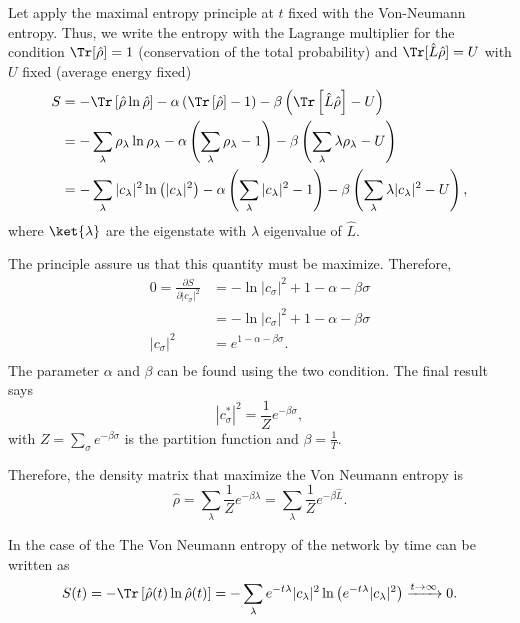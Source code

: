 Let apply the maximal entropy principle at $t$ fixed with the Von-Neumann entropy. Thus, we write the entropy with the Lagrange multiplier for the condition $\Tr[\hat\rho] = 1$ (conservation of the total probability) and $\Tr[\hat L\hat\rho] = U$ with $U$ fixed (average energy fixed)
\begin{equation*}
    \begin{split}
        S &= -\Tr\left[\hat\rho\ln\hat\rho\right] - \alpha\left(\Tr\left[\hat\rho\right] - 1\right) -\beta\left(\Tr\left[\hat L\hat\rho\right] - U\right)\\
        &= -\sum_\lambda \rho_\lambda\ln \rho_\lambda - \alpha\left(\sum_\lambda \rho_\lambda - 1\right) -\beta\left(\sum_\lambda\lambda \rho_\lambda - U\right)\\
        & = -\sum_\lambda |c_\lambda|^2\ln \left(|c_\lambda|^2\right) - \alpha\left(\sum_\lambda |c_\lambda|^2 - 1\right) -\beta\left(\sum_\lambda\lambda |c_\lambda|^2 - U\right),
    \end{split}
\end{equation*}
where $\ket{\lambda}$ are the eigenstate with $\lambda$ eigenvalue of $\hat L$.

The principle assure us that this quantity must be maximize. Therefore,
\begin{equation}
    \begin{split}
        0 = \frac{\partial S}{\partial |c_\sigma|^2} &= -\ln |c_\sigma|^2 + 1 -\alpha -\beta\sigma\\
        &=-\ln|c_\sigma|^2 + 1 - \alpha -\beta\sigma\\  
        |c_\sigma|^2 &= e^{1 - \alpha -\beta\sigma}.\\
    \end{split}
\end{equation}
The parameter $\alpha$ and $\beta$ can be found using the two condition. The final result says
\begin{equation}
    |c_\sigma^*|^2 = \frac{1}{Z}e^{-\beta\sigma},
\end{equation}
with $Z = \sum_\sigma e^{-\beta\sigma}$ is the partition function and $\beta = \frac{1}{T}$.

Therefore, the density matrix that maximize the Von Neumann entropy is
\begin{equation}\label{maximal_distribution}
    \hat \rho = \sum_\lambda \frac{1}{Z}e^{-\beta\lambda} = \sum_\lambda \frac{1}{Z}e^{-\beta\hat L}.
\end{equation}

In the case of the 
The Von Neumann entropy of the network by time can be written as
\begin{equation}
        S(t) = -\Tr\left[\hat\rho(t)\ln\hat\rho(t)\right] = -\sum_\lambda e^{-t\lambda}|c_\lambda|^2\ln \left(e^{-t\lambda}|c_\lambda|^2\right) \xrightarrow{t\rightarrow\infty} 0 .
\end{equation}

